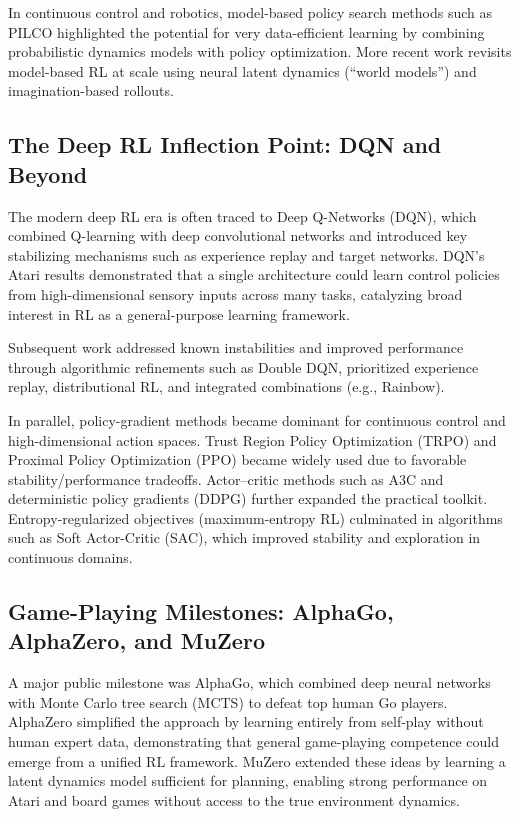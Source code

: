 \documentclass[10pt]{article}
\begin{document}
In continuous control and robotics, model-based policy search methods such as PILCO highlighted the potential for very data-efficient learning by combining probabilistic dynamics models with policy optimization.\cite{deisenroth2011pilco}
More recent work revisits model-based RL at scale using neural latent dynamics (``world models'') and imagination-based rollouts.\cite{hafner2020dreamer,janner2019mbpo}

\subsection{The Deep RL Inflection Point: DQN and Beyond}

The modern deep RL era is often traced to Deep Q-Networks (DQN), which combined Q-learning with deep convolutional networks and introduced key stabilizing mechanisms such as experience replay and target networks.\cite{mnih2015dqn}
DQN’s Atari results demonstrated that a single architecture could learn control policies from high-dimensional sensory inputs across many tasks, catalyzing broad interest in RL as a general-purpose learning framework.

Subsequent work addressed known instabilities and improved performance through algorithmic refinements such as Double DQN,\cite{hasselt2016double}
prioritized experience replay,\cite{schaul2016prioritized}
distributional RL,\cite{bellemare2017distributional}
and integrated combinations (e.g., Rainbow).\cite{hessel2018rainbow}

In parallel, policy-gradient methods became dominant for continuous control and high-dimensional action spaces.
Trust Region Policy Optimization (TRPO) and Proximal Policy Optimization (PPO) became widely used due to favorable stability/performance tradeoffs.\cite{schulman2015trpo,schulman2017ppo}
Actor--critic methods such as A3C and deterministic policy gradients (DDPG) further expanded the practical toolkit.\cite{mnih2016a3c,lillicrap2016ddpg}
Entropy-regularized objectives (maximum-entropy RL) culminated in algorithms such as Soft Actor-Critic (SAC), which improved stability and exploration in continuous domains.\cite{haarnoja2018sac}

\subsection{Game-Playing Milestones: AlphaGo, AlphaZero, and MuZero}

A major public milestone was AlphaGo, which combined deep neural networks with Monte Carlo tree search (MCTS) to defeat top human Go players.\cite{silver2016alphago}
AlphaZero simplified the approach by learning entirely from self-play without human expert data, demonstrating that general game-playing competence could emerge from a unified RL framework.\cite{silver2017alphazero}
MuZero extended these ideas by learning a latent dynamics model sufficient for planning, enabling strong performance on Atari and board games without access to the true environment dynamics.\cite{schrittwieser2020muzero}
\end{document}
